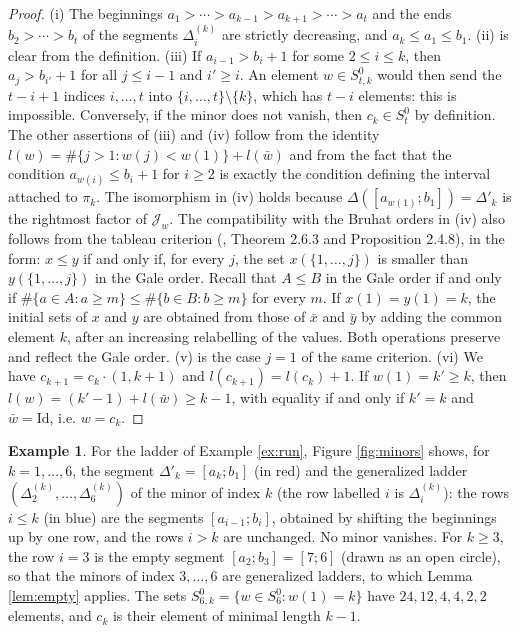 \documentclass[a4paper,12pt,leqno]{amsart}
\newcommand{\caJ}{\mathcal{J}}
\theoremstyle{plain}
\theoremstyle{definition}
\theoremstyle{definition}
\newtheorem{example}[thm]{Example}
\newcommand{\Id}{\mathrm{Id}}
\begin{document}
\begin{proof}
(i) The beginnings $a_1>\cdots>a_{k-1}>a_{k+1}>\cdots>a_t$ and the ends $b_2>\cdots>b_t$ of the segments
$\Delta^{(k)}_i$ are strictly decreasing, and $a_k\leq a_1\leq b_1$. (ii) is clear from the
definition. (iii) If $a_{i-1}>b_i+1$
for some $2\leq i\leq k$, then $a_j>b_{i'}+1$ for all $j\leq i-1$ and $i'\geq i$. An element $w\in
S^0_{t,k}$ would then
send the $t-i+1$ indices $i,\ldots,t$ into $\{i,\ldots,t\}\setminus\{k\}$, which has $t-i$
elements: this is impossible.
Conversely, if the minor does not vanish, then $c_k\in S_t^0$ by definition. The other assertions
of (iii) and (iv)
follow from the identity $l(w)=\#\{j>1 : w(j)<w(1)\}+l(\bar w)$ and from the fact that the
condition $a_{w(i)}\leq b_i+1$
 for $i\geq 2$ is exactly the condition defining the interval attached to $\pi_k$. The isomorphism
 in (iv) holds because
 $\Delta([a_{w(1)};b_1])=\Delta'_k$ is the rightmost factor of $\caJ_w$. The compatibility with the
 Bruhat orders in (iv) also
 follows from the tableau criterion (\cite{BB05}, Theorem 2.6.3 and Proposition 2.4.8), in the
 form: $x\leq y$ if and only if,
 for every $j$, the set $x(\{1,\ldots,j\})$ is smaller than $y(\{1,\ldots,j\})$ in the Gale order.
 Recall that $A\leq B$ in the
 Gale order if and only if $\#\{a\in A : a\geq m\}\leq\#\{b\in B : b\geq m\}$ for every $m$. If
 $x(1)=y(1)=k$, the initial
 sets of $x$ and $y$ are obtained from those of $\bar x$ and $\bar y$ by adding the common element $k$,
 after an increasing relabelling of the values. Both operations preserve and reflect the Gale
 order. (v) is the case $j=1$ of the same criterion. (vi) We have $c_{k+1}=c_k\cdot(1,k+1)$ and
 $l(c_{k+1})=l(c_k)+1$. If $w(1)=k'\geq k$, then $l(w)=(k'-1)+l(\bar w)\geq k-1$, with equality if
 and only if $k'=k$ and $\bar w=\Id$, i.e. $w=c_k$.
\end{proof}


\begin{example}\label{ex:run3} For the ladder of Example \ref{ex:run}, Figure \ref{fig:minors} shows,
for $k=1,\ldots,6$, the segment $\Delta'_k=[a_k;b_1]$ (in red) and the generalized ladder
$(\Delta^{(k)}_2,\ldots,\Delta^{(k)}_6)$ of the minor of index $k$ (the row labelled $i$ is
$\Delta^{(k)}_i$): the rows $i\leq k$ (in blue) are
the segments $[a_{i-1};b_i]$, obtained by shifting the beginnings up by one row, and the rows
$i>k$ are unchanged. No minor vanishes. For $k\geq3$, the row $i=3$ is the empty segment
$[a_2;b_3]=[7;6]$ (drawn as an open circle), so that the minors of index $3,\ldots,6$ are
generalized ladders, to which Lemma \ref{lem:empty} applies. The sets $S^0_{6,k}=\{w\in S_6^0:
w(1)=k\}$ have $24,12,4,4,2,2$ elements, and $c_k$ is their element of minimal length $k-1$.
\end{example}
\end{document}
